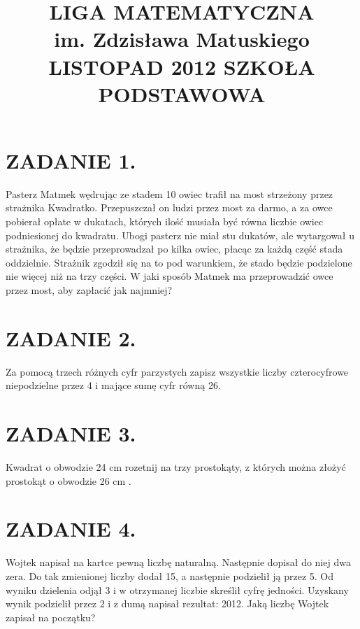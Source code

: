 \documentclass[10pt]{article}
\title{LIGA MATEMATYCZNA \\
 im. Zdzisława Matuskiego \\
 LISTOPAD 2012 SZKOŁA PODSTAWOWA }
\author{}
\date{}
\begin{document}
\maketitle
\section*{ZADANIE 1.}
Pasterz Matmek wędrując ze stadem 10 owiec trafił na most strzeżony przez strażnika Kwadratko. Przepuszczał on ludzi przez most za darmo, a za owce pobierał opłate w dukatach, których ilość musiała być równa liczbie owiec podniesionej do kwadratu. Ubogi pasterz nie miał stu dukatów, ale wytargował u strażnika, że będzie przeprowadzał po kilka owiec, płacąc za każdą część stada oddzielnie. Strażnik zgodził się na to pod warunkiem, że stado będzie podzielone nie więcej niż na trzy części. W jaki sposób Matmek ma przeprowadzić owce przez most, aby zapłacić jak najmniej?

\section*{ZADANIE 2.}
Za pomocą trzech różnych cyfr parzystych zapisz wszystkie liczby czterocyfrowe niepodzielne przez 4 i mające sumę cyfr równą 26.

\section*{ZADANIE 3.}
Kwadrat o obwodzie 24 cm rozetnij na trzy prostokąty, z których można złożyć prostokąt o obwodzie 26 cm .

\section*{ZADANIE 4.}
Wojtek napisał na kartce pewną liczbę naturalną. Następnie dopisał do niej dwa zera. Do tak zmienionej liczby dodał 15, a następnie podzielił ją przez 5. Od wyniku dzielenia odjął 3 i w otrzymanej liczbie skreślił cyfrę jedności. Uzyskany wynik podzielił przez 2 i z dumą napisał rezultat: 2012. Jaką liczbę Wojtek zapisał na początku?
\end{document}
